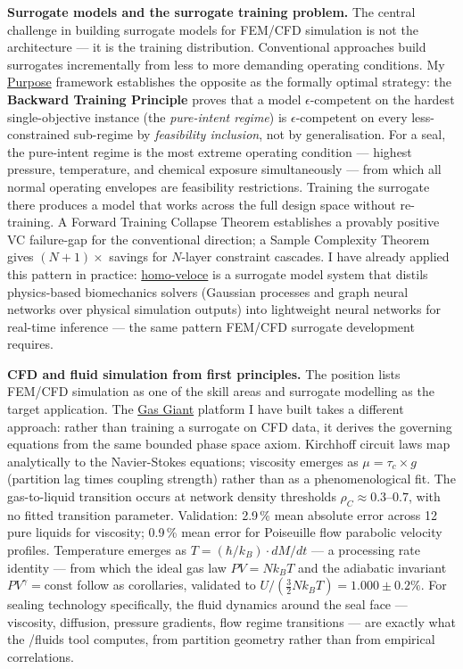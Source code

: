 \documentclass[12pt,a4paper]{article}
\begin{document}
\textbf{Surrogate models and the surrogate training problem.}
The central challenge in building surrogate models for FEM/CFD simulation is not
the architecture --- it is the training distribution. Conventional approaches
build surrogates incrementally from less to more demanding operating conditions.
My \href{https://github.com/fullscreen-triangle/purpose}{Purpose} framework
establishes the opposite as the formally optimal strategy: the
\textbf{Backward Training Principle} proves that a model $\epsilon$-competent
on the hardest single-objective instance (the \emph{pure-intent regime}) is
$\epsilon$-competent on every less-constrained sub-regime by \emph{feasibility
inclusion}, not by generalisation. For a seal, the pure-intent regime is the
most extreme operating condition --- highest pressure, temperature, and
chemical exposure simultaneously --- from which all normal operating envelopes
are feasibility restrictions. Training the surrogate there produces a model
that works across the full design space without
re-training. A Forward Training Collapse Theorem establishes a provably
positive VC failure-gap for the conventional direction; a Sample Complexity
Theorem gives $(N+1)\times$ savings for $N$-layer constraint cascades.
I have already applied this pattern in practice:
\href{https://github.com/fullscreen-triangle/homo-veloce}{homo-veloce}
is a surrogate model system that distils physics-based biomechanics solvers
(Gaussian processes and graph neural networks over physical simulation outputs)
into lightweight neural networks for real-time inference --- the same pattern
FEM/CFD surrogate development requires.

\textbf{CFD and fluid simulation from first principles.}
The position lists FEM/CFD simulation as one of the skill areas and surrogate
modelling as the target application. The
\href{https://gas-giant.vercel.app/simulate}{Gas Giant} platform I have built
takes a different approach: rather than training a surrogate on CFD data, it
derives the governing equations from the same bounded phase space axiom.
Kirchhoff circuit laws map analytically to the Navier-Stokes equations;
viscosity emerges as $\mu = \tau_c \times g$ (partition lag times coupling
strength) rather than as a phenomenological fit. The gas-to-liquid transition
occurs at network density thresholds $\rho_C \approx 0.3$--$0.7$, with no
fitted transition parameter.
Validation: 2.9\,\% mean absolute error across 12 pure liquids for viscosity;
0.9\,\% mean error for Poiseuille flow parabolic velocity profiles.
Temperature emerges as $T = (\hbar/k_B) \cdot dM/dt$ --- a processing
rate identity --- from which the ideal gas law $PV = Nk_BT$ and the
adiabatic invariant $PV^\gamma = \mathrm{const}$ follow as corollaries,
validated to $U/({\tfrac{3}{2}}Nk_BT) = 1.000 \pm 0.2\%$.
For sealing technology specifically, the fluid dynamics around the seal face ---
viscosity, diffusion, pressure gradients, flow regime transitions --- are
exactly what the /fluids tool computes, from partition geometry rather than
from empirical correlations.
\end{document}
